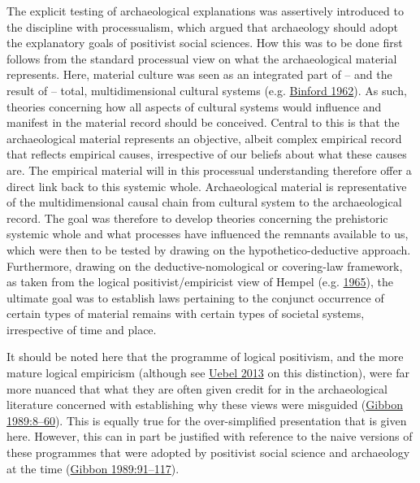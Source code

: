 \documentclass[
  a4paper,
  oneside]{uiophdthesis}
\begin{document}
The explicit testing of archaeological explanations was assertively introduced to the discipline with processualism, which argued that archaeology should adopt the explanatory goals of positivist social sciences. How this was to be done first follows from the standard processual view on what the archaeological material represents. Here, material culture was seen as an integrated part of -- and the result of -- total, multidimensional cultural systems (e.g. \protect\hyperlink{ref-binford1962}{Binford 1962}). As such, theories concerning how all aspects of cultural systems would influence and manifest in the material record should be conceived. Central to this is that the archaeological material represents an objective, albeit complex empirical record that reflects empirical causes, irrespective of our beliefs about what these causes are. The empirical material will in this processual understanding therefore offer a direct link back to this systemic whole. Archaeological material is representative of the multidimensional causal chain from cultural system to the archaeological record. The goal was therefore to develop theories concerning the prehistoric systemic whole and what processes have influenced the remnants available to us, which were then to be tested by drawing on the hypothetico-deductive approach. Furthermore, drawing on the deductive-nomological or covering-law framework, as taken from the logical positivist/empiricist view of Hempel (e.g. \protect\hyperlink{ref-hempel1965}{1965}), the ultimate goal was to establish laws pertaining to the conjunct occurrence of certain types of material remains with certain types of societal systems, irrespective of time and place.

It should be noted here that the programme of logical positivism, and the more mature logical empiricism (although see \protect\hyperlink{ref-uebel2013}{Uebel 2013} on this distinction), were far more nuanced that what they are often given credit for in the archaeological literature concerned with establishing why these views were misguided (\protect\hyperlink{ref-gibbon1989}{Gibbon 1989:8--60}). This is equally true for the over-simplified presentation that is given here. However, this can in part be justified with reference to the naive versions of these programmes that were adopted by positivist social science and archaeology at the time (\protect\hyperlink{ref-gibbon1989}{Gibbon 1989:91--117}).
\end{document}
